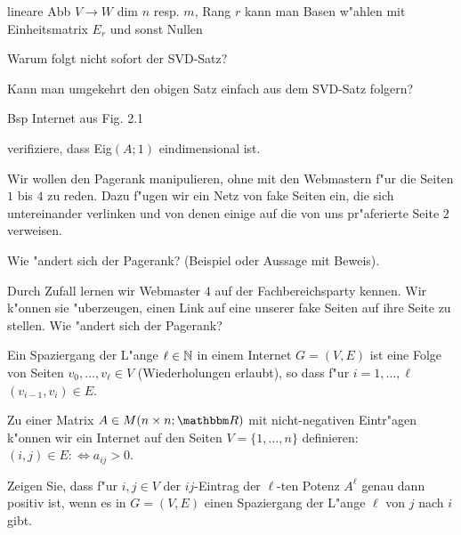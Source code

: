 \documentclass[a4,11pt]{article}
\begin{document}
\vspace*{-17mm}
{
\kopf
}



\begin{aufgabe}[4 Punkte]
lineare Abb $V \to W$ dim $n$ resp. $m$, Rang $r$ kann man Basen
w"ahlen mit Einheitsmatrix $E_r$ und sonst Nullen

Warum folgt nicht sofort der SVD-Satz?

Kann man umgekehrt den obigen Satz einfach aus dem SVD-Satz folgern?  
\end{aufgabe}

\begin{aufgabe}[4 Punkte]
  Bsp Internet aus Fig. 2.1

  verifiziere, dass Eig$(A;1)$ eindimensional ist.

  Wir wollen den Pagerank manipulieren, ohne mit den Webmastern f"ur
  die Seiten $1$ bis $4$ zu reden. Dazu f"ugen wir ein Netz von fake
  Seiten ein, die sich untereinander verlinken und von denen einige
  auf die von uns pr"aferierte Seite $2$ verweisen.

  Wie "andert sich der Pagerank? (Beispiel oder Aussage mit Beweis).

  Durch Zufall lernen wir Webmaster $4$ auf der Fachbereichsparty
  kennen. Wir k"onnen sie "uberzeugen, einen Link auf eine unserer
  fake Seiten auf ihre Seite zu stellen. Wie "andert sich der Pagerank?
  
  
\end{aufgabe}


\begin{aufgabe}[4 Punkte]
Ein Spaziergang der L"ange $\ell \in \mathbb N$ in einem Internet $G=(V,E)$ ist
eine Folge von Seiten $v_0, \ldots, v_\ell \in V$ (Wiederholungen
erlaubt), so dass f"ur $i=1, \ldots, \ell$ $(v_{i-1},v_i) \in E$.

Zu einer Matrix $A \in M(n \times n; \R)$ mit nicht-negativen
Eintr"agen k"onnen wir ein Internet auf den Seiten $V = \{ 1, \ldots,
n \}$ definieren: $(i,j) \in E :\Leftrightarrow a_{ij} > 0$.

Zeigen Sie, dass f"ur $i,j \in V$ der $ij$-Eintrag der $\ell$-ten
Potenz $A^\ell$ genau dann positiv ist, wenn es in $G=(V,E)$ einen
Spaziergang der L"ange $\ell$ von $j$ nach $i$ gibt.
  
\end{aufgabe}
\end{document}
